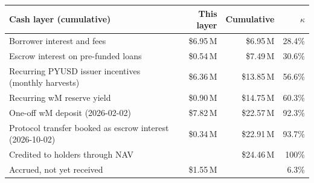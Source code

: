 \begin{tabular}{@{}lrrr@{}}
\toprule
Cash layer (cumulative) & This layer & Cumulative & $\kappa$ \\
\midrule
Borrower interest and fees & \$6.95\,M & \$6.95\,M & 28.4\% \\
Escrow interest on pre-funded loans & \$0.54\,M & \$7.49\,M & 30.6\% \\
Recurring PYUSD issuer incentives (monthly harvests) & \$6.36\,M & \$13.85\,M & 56.6\% \\
Recurring wM reserve yield & \$0.90\,M & \$14.75\,M & 60.3\% \\
One-off wM deposit (2026-02-02) & \$7.82\,M & \$22.57\,M & 92.3\% \\
Protocol transfer booked as escrow interest (2026-10-02) & \$0.34\,M & \$22.91\,M & 93.7\% \\
\midrule
Credited to holders through NAV & & \$24.46\,M & 100\% \\
Accrued, not yet received & \$1.55\,M & & 6.3\% \\
\bottomrule
\end{tabular}
